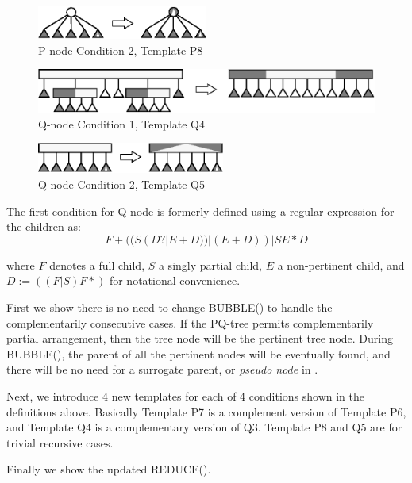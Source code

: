 \documentclass[a4]{jgaa-art}
\begin{document}
\begin{figure}[!htb]
  \centering
  \includegraphics[width=0.5\textwidth]{pq_tree_sample_03}
  \caption{P-node Condition 2, Template P8}
  \label{fig:pq_tree_03}
\end{figure}

\begin{figure}[!htb]
  \centering
  \includegraphics[width=\textwidth]{pq_tree_sample_04}
  \caption{Q-node Condition 1, Template Q4}
  \label{fig:pq_tree_04}
\end{figure}

\begin{figure}[!htb]
  \centering
  \includegraphics[width=0.55\textwidth]{pq_tree_sample_05}
  \caption{Q-node Condition 2, Template Q5}
  \label{fig:pq_tree_05}
\end{figure}


The first condition for Q-node is formerly defined using a regular expression 
for the children as:
\[F+((S(D?|E+D))|(E+D))|SE*D\]

where $F$ denotes a full child, $S$ a singly partial child, $E$ a 
 non-pertinent child, and $D:=((F|S)F*)$ for notational convenience.

First we show there is no need to change BUBBLE() to handle the complementarily
 consecutive cases.
If the PQ-tree permits complementarily partial arrangement, then the tree
node will be the pertinent tree node. During BUBBLE(), the parent of
all the pertinent nodes will be eventually found, and there will be no need
for a surrogate parent, or {\it pseudo node} in \cite{BL76}.

Next, we introduce 4 new templates for each of 4 conditions shown in the
 definitions above. Basically Template P7 is a complement version of Template P6,
and Template Q4 is a complementary version of Q3. Template P8 and Q5 are
for trivial recursive cases.

Finally we show the updated REDUCE().
\end{document}
